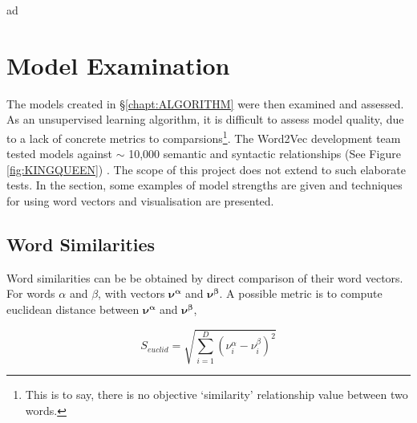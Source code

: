 ad\chapter{Model Examination}
\label{chapt:VALIDATION}
The models created in  \S\ref{chapt:ALGORITHM} were then examined and assessed. As an unsupervised learning algorithm, it is difficult to assess model quality, due to a lack of concrete metrics to comparsions\footnote{This is to say, there is no objective `similarity' relationship value between two words.}. The Word2Vec development team tested models against $\sim$ 10,000 semantic and syntactic relationships (See Figure \ref{fig:KINGQUEEN})\cite{word2vec1} \cite{word2vec2} \cite{word2veckingqueen}. The scope of this project does not extend to such elaborate tests. In the section, some examples of model strengths are given and techniques for using word vectors and visualisation are presented. 
\section{Word Similarities}
Word similarities can be be obtained by direct comparison of their word vectors. For words $\alpha$ and $\beta$, with vectors $\mathbf{\nu^\alpha}$ and $\mathbf{\nu^\beta}$.  A possible metric is to compute euclidean distance between $\mathbf{\nu^\alpha}$ and $\mathbf{\nu^\beta}$, 

$$S_{euclid} = \sqrt{\sum_{i=1}^{D}(\nu_i^{\alpha}-\nu_i^{\beta})^{2}} $$

